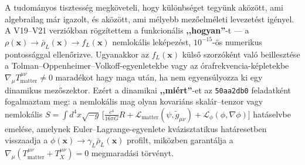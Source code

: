 \documentclass[10pt,a4paper]{article}
\begin{document}
\par
A tudom\'anyos tisztess\'eg megk\"oveteli, hogy k\"ul\"onbs\'eget tegy\"unk ak\"oz\"ott, ami algebrailag m\'ar igazolt, \'es ak\"oz\"ott, ami m\'elyebb mez\H{o}elm\'eleti levezet\'est ig\'enyel. A V19--V21 verzi\'okban r\"ogz\'itettem a funkcion\'alis \textbf{,,hogyan''}-t --- a $\rho(\mathbf{x}) \to \bar{\rho}_L(\mathbf{x}) \to f_L(\mathbf{x})$ nemlok\'alis lek\'epez\'est, $10^{-15}$-\"os numerikus pontoss\'aggal ellen\H{o}rizve. Ugyanakkor az $f_L(\mathbf{x})$ k\"uls\H{o} szorz\'ok\'ent val\'o beilleszt\'ese a Tolman--Oppenheimer--Volkoff-egyenletekbe vagy az \'orafrekvencia-k\'epletekbe $\nabla_\mu T^{\mu\nu}_{\text{matter}} \neq 0$ marad\'ekot hagy maga ut\'an, ha nem egyens\'ulyozza ki egy dinamikus mez\H{o}szektor. Ez\'ert a dinamikai \textbf{,,mi\'ert''}-et az \texttt{50aa2db0} feladatk\'ent fogalmaztam meg: a nemlok\'alis mag olyan kovari\'ans skal\'ar--tenzor vagy nemlok\'alis $S = \int d^4x\sqrt{-g}\,\bigl[\frac{c^4}{16\pi G}R + \mathcal{L}_{\text{matter}}(\psi, \tilde{g}_{\mu\nu}) + \mathcal{L}_\phi(\phi,\nabla\phi)\bigr]$ hat\'aselvbe emel\'ese, amelynek Euler--Lagrange-egyenlete kv\'azisztatikus hat\'aresetben visszaadja a $\phi(\mathbf{x}) \to \gamma_L\bar{\rho}_L(\mathbf{x})$ profilt, mik\"ozben garant\'alja a $\nabla_\mu(T^{\mu\nu}_{\text{matter}} + T^{\mu\nu}_X) = 0$ megmarad\'asi t\"orv\'enyt.
\end{document}
